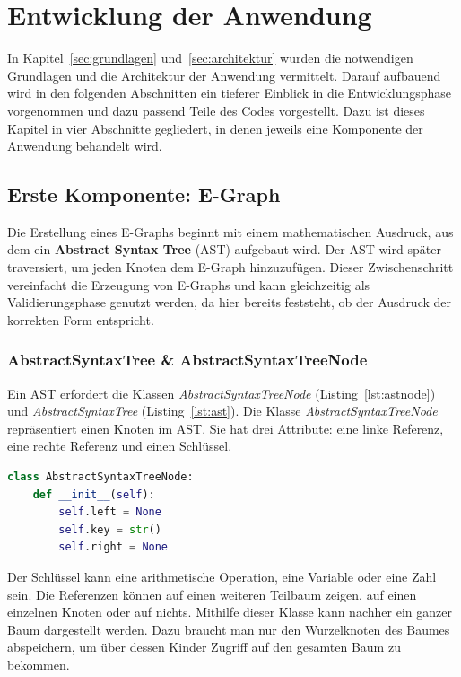 \section{Entwicklung der Anwendung}\label{sec:entwicklung}

In Kapitel~\ref{sec:grundlagen} und~\ref{sec:architektur} wurden die notwendigen Grundlagen und die Architektur der Anwendung vermittelt.
Darauf aufbauend wird in den folgenden Abschnitten ein tieferer Einblick in die Entwicklungsphase vorgenommen und dazu passend Teile des Codes vorgestellt.
Dazu ist dieses Kapitel in vier Abschnitte gegliedert, in denen jeweils eine Komponente der Anwendung behandelt wird.

\subsection{Erste Komponente: E-Graph}

Die Erstellung eines E-Graphs beginnt mit einem mathematischen Ausdruck, aus dem ein \textbf{Abstract Syntax Tree} (AST) aufgebaut wird.
Der AST wird später traversiert, um jeden Knoten dem E-Graph hinzuzufügen. Dieser Zwischenschritt vereinfacht die Erzeugung von E-Graphs und
kann gleichzeitig als Validierungsphase genutzt werden, da hier bereits feststeht, ob der Ausdruck der korrekten Form entspricht.

\subsubsection{AbstractSyntaxTree \& AbstractSyntaxTreeNode}

Ein AST erfordert die Klassen \textit{AbstractSyntaxTreeNode} (Listing~\ref{lst:astnode}) und 
\textit{AbstractSyntaxTree} (Listing~\ref{lst:ast}). Die Klasse \textit{AbstractSyntaxTreeNode} repräsentiert
einen Knoten im AST. Sie hat drei Attribute: eine linke Referenz, eine rechte Referenz und einen Schlüssel.

\begin{lstlisting}[language=Python, caption=Klasse \textit{AbstractSyntaxTreeNode}, label={lst:astnode}]
class AbstractSyntaxTreeNode:
    def __init__(self):
        self.left = None
        self.key = str()
        self.right = None
\end{lstlisting}

Der Schlüssel kann eine arithmetische Operation, eine Variable oder eine Zahl sein. Die Referenzen können auf einen weiteren Teilbaum zeigen, auf einen einzelnen Knoten
oder auf nichts. Mithilfe dieser Klasse kann nachher ein ganzer Baum dargestellt werden. Dazu braucht man nur den Wurzelknoten des Baumes abspeichern, um über dessen Kinder
Zugriff auf den gesamten Baum zu bekommen. 

